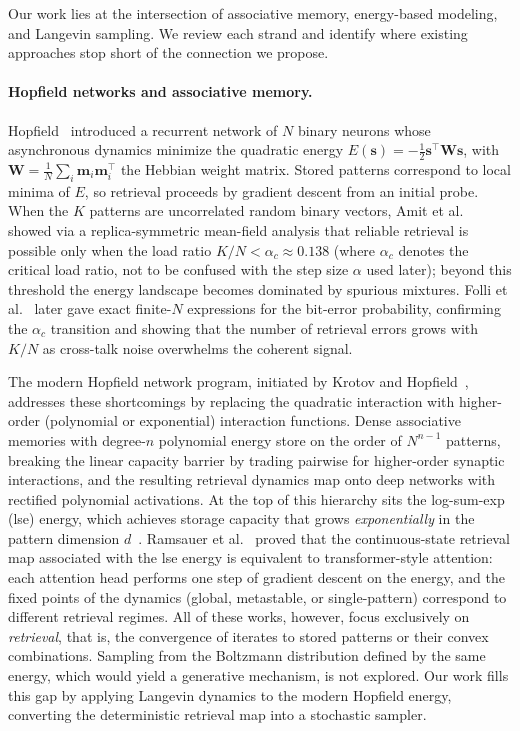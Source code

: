 
Our work lies at the intersection of associative memory, energy-based modeling, and Langevin sampling. We review each strand and identify where existing approaches stop short of the connection we propose.

\paragraph{Hopfield networks and associative memory.}
Hopfield~\cite{hopfieldNeuralNetworksPhysical1982} introduced a recurrent network of $N$ binary neurons whose asynchronous dynamics minimize the quadratic energy $E(\mathbf{s})=-\frac{1}{2}\mathbf{s}^{\top}\mathbf{W}\mathbf{s}$, with $\mathbf{W}=\frac{1}{N}\sum_{i}\mathbf{m}_i\mathbf{m}_i^{\top}$ the Hebbian weight matrix. Stored patterns correspond to local minima of $E$, so retrieval proceeds by gradient descent from an initial probe. When the $K$ patterns are uncorrelated random binary vectors, Amit et al.~\cite{amitStoringInfiniteNumbers1985} showed via a replica-symmetric mean-field analysis that reliable retrieval is possible only when the load ratio $K/N < \alpha_c \approx 0.138$ (where $\alpha_c$ denotes the critical load ratio, not to be confused with the step size $\alpha$ used later); beyond this threshold the energy landscape becomes dominated by spurious mixtures. Folli et al.~\cite{folliMaximumStorageCapacity2017} later gave exact finite-$N$ expressions for the bit-error probability, confirming the $\alpha_c$ transition and showing that the number of retrieval errors grows with $K/N$ as cross-talk noise overwhelms the coherent signal.

The modern Hopfield network program, initiated by Krotov and Hopfield~\cite{krotovDenseAssociativeMemory2016}, addresses these shortcomings by replacing the quadratic interaction with higher-order (polynomial or exponential) interaction functions. Dense associative memories with degree-$n$ polynomial energy store on the order of $N^{n-1}$ patterns, breaking the linear capacity barrier by trading pairwise for higher-order synaptic interactions, and the resulting retrieval dynamics map onto deep networks with rectified polynomial activations. At the top of this hierarchy sits the log-sum-exp (lse) energy, which achieves storage capacity that grows \emph{exponentially} in the pattern dimension $d$~\cite{ramsauerHopfieldNetworksAll2021}. Ramsauer et al.~\cite{ramsauerHopfieldNetworksAll2021} proved that the continuous-state retrieval map associated with the lse energy is equivalent to transformer-style attention: each attention head performs one step of gradient descent on the energy, and the fixed points of the dynamics (global, metastable, or single-pattern) correspond to different retrieval regimes. All of these works, however, focus exclusively on \emph{retrieval}, that is, the convergence of iterates to stored patterns or their convex combinations. Sampling from the Boltzmann distribution defined by the same energy, which would yield a generative mechanism, is not explored. Our work fills this gap by applying Langevin dynamics to the modern Hopfield energy, converting the deterministic retrieval map into a stochastic sampler.


